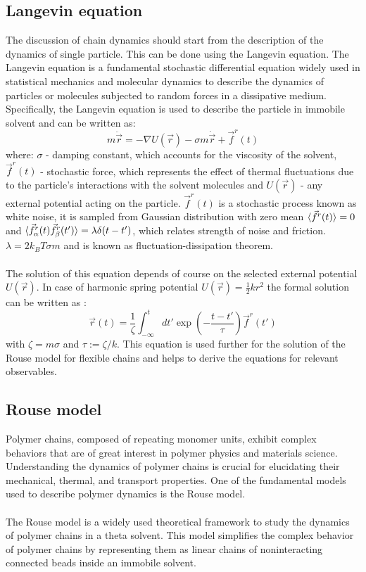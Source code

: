 \documentclass[
    paper=A4,pagesize=automedia,fontsize=12pt,
    BCOR=15mm,DIV=22,
    twoside,headinclude,footinclude=false,
    fleqn,             %
    bibliography=totocnumbered,          %
    listof=totoc,                %
    listof=flat,                 %
    cleardoublepage=empty      %
    numbers=endperiod
]{scrartcl}
\begin{document}
\subsection{Langevin equation} \label{section:langevin_eq}
The discussion of chain dynamics should start from the description of
the dynamics of single particle. This can be done using the Langevin equation. 
The Langevin equation is a fundamental stochastic differential equation 
widely used in statistical mechanics and molecular dynamics to describe the 
dynamics of particles or molecules subjected to random forces in a 
dissipative medium. Specifically, the Langevin equation is used to describe the 
particle in immobile solvent and can be written as:
\begin{equation} \label{eq:langevin}
    m \ddot{\vec{r}} = - \nabla U(\vec{r}) - \sigma m \dot{\vec{r}} + \vec{f}^r(t)
\end{equation}
where: $\sigma$ - damping constant, which accounts for the viscosity of the solvent,
$\vec{f}^r(t)$ - stochastic force, which represents the effect of thermal 
fluctuations due to the particle's interactions with the solvent molecules and
$U(\vec{r})$ - any external potential acting on the particle.
$\vec{f}^r(t)$ is a stochastic process known as white noise,
it is sampled from Gaussian distribution with zero mean $\langle\vec{f}^r(t)\rangle = 0$ 
and $\langle\vec{f}_{\alpha}^r(t) \vec{f}_{\beta}^r(t')\rangle = \lambda \delta(t-t')$,
which relates strength of noise and friction. $\lambda=2 k_B T \sigma m$ and is known
as fluctuation-dissipation theorem.
\\
\\
The solution of this equation depends of course on the selected external
potential $U(\vec{r})$. In case of harmonic spring potential 
$U(\vec{r})=\frac{1}{2} k r^2$ the formal solution can be written as \cite{Doi_Edwards_PD:1994}:
\begin{equation}
    \vec{r}(t)=\frac{1}{\zeta}\int_{-\infty}^{t} dt' \exp\left(-\frac{t-t'}{\tau}\right)\vec{f}^r(t')
\end{equation}
with $\zeta=m \sigma$ and $\tau := \zeta / k$. This equation is used further for the
solution of the Rouse model for flexible chains and helps 
to derive \cite{Doi_Edwards_PD:1994} the equations for relevant observables.

\subsection{Rouse model}
Polymer chains, composed of repeating monomer units, exhibit complex 
behaviors that are of great interest in polymer physics and materials science. 
Understanding the dynamics of polymer chains is crucial for elucidating their 
mechanical, thermal, and transport properties. One of the fundamental 
models used to describe polymer dynamics is the Rouse model.
\\
\\
The Rouse model is a widely used theoretical framework to study the dynamics 
of polymer chains in a theta solvent. This model simplifies the complex 
behavior of polymer chains by representing them as linear chains of noninteracting 
connected beads inside an immobile solvent.
\end{document}
